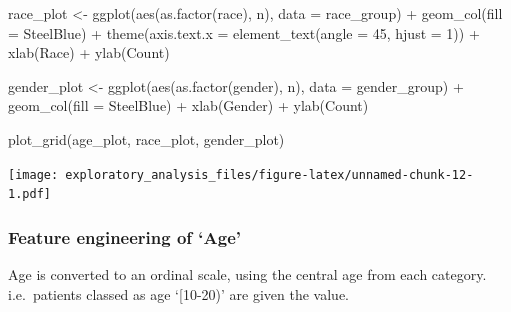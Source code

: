 \documentclass[
]{article}
\newenvironment{Shaded}{\begin{snugshade}}{\end{snugshade}}
\newcommand{\AttributeTok}[1]{\textcolor[rgb]{0.77,0.63,0.00}{#1}}
\newcommand{\DecValTok}[1]{\textcolor[rgb]{0.00,0.00,0.81}{#1}}
\newcommand{\FunctionTok}[1]{\textcolor[rgb]{0.00,0.00,0.00}{#1}}
\newcommand{\NormalTok}[1]{#1}
\newcommand{\OtherTok}[1]{\textcolor[rgb]{0.56,0.35,0.01}{#1}}
\newcommand{\SpecialCharTok}[1]{\textcolor[rgb]{0.00,0.00,0.00}{#1}}
\newcommand{\StringTok}[1]{\textcolor[rgb]{0.31,0.60,0.02}{#1}}
\begin{document}
\begin{Shaded}
\begin{Highlighting}[]
\NormalTok{race\_plot }\OtherTok{\textless{}{-}}
  \FunctionTok{ggplot}\NormalTok{(}\FunctionTok{aes}\NormalTok{(}\FunctionTok{as.factor}\NormalTok{(race), n), }\AttributeTok{data =}\NormalTok{ race\_group) }\SpecialCharTok{+}
  \FunctionTok{geom\_col}\NormalTok{(}\AttributeTok{fill =} \StringTok{\textquotesingle{}SteelBlue\textquotesingle{}}\NormalTok{) }\SpecialCharTok{+}
  \FunctionTok{theme}\NormalTok{(}\AttributeTok{axis.text.x =} \FunctionTok{element\_text}\NormalTok{(}\AttributeTok{angle =} \DecValTok{45}\NormalTok{, }\AttributeTok{hjust =} \DecValTok{1}\NormalTok{)) }\SpecialCharTok{+}
  \FunctionTok{xlab}\NormalTok{(}\StringTok{\textquotesingle{}Race\textquotesingle{}}\NormalTok{) }\SpecialCharTok{+}
  \FunctionTok{ylab}\NormalTok{(}\StringTok{\textquotesingle{}Count\textquotesingle{}}\NormalTok{)}

\NormalTok{gender\_plot }\OtherTok{\textless{}{-}}
  \FunctionTok{ggplot}\NormalTok{(}\FunctionTok{aes}\NormalTok{(}\FunctionTok{as.factor}\NormalTok{(gender), n), }\AttributeTok{data =}\NormalTok{ gender\_group) }\SpecialCharTok{+}
  \FunctionTok{geom\_col}\NormalTok{(}\AttributeTok{fill =} \StringTok{\textquotesingle{}SteelBlue\textquotesingle{}}\NormalTok{) }\SpecialCharTok{+}
  \FunctionTok{xlab}\NormalTok{(}\StringTok{\textquotesingle{}Gender\textquotesingle{}}\NormalTok{) }\SpecialCharTok{+}
  \FunctionTok{ylab}\NormalTok{(}\StringTok{\textquotesingle{}Count\textquotesingle{}}\NormalTok{)}


\FunctionTok{plot\_grid}\NormalTok{(age\_plot, race\_plot, gender\_plot)}
\end{Highlighting}
\end{Shaded}

\texttt{[image: exploratory\_analysis\_files/figure-latex/unnamed-chunk-12-1.pdf]}

\hypertarget{feature-engineering-of-age}{%
\subsubsection{Feature engineering of
`Age'}\label{feature-engineering-of-age}}

Age is converted to an ordinal scale, using the central age from each
category. i.e.~patients classed as age `{[}10-20)' are given the value.
\end{document}
